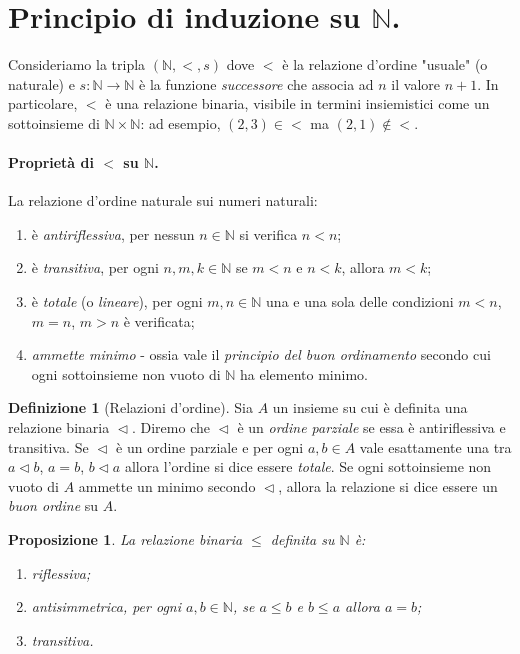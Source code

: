 \documentclass[fontsize = 11 pt, paper=A4, oneside, index=totoc, hyperref]{article}
\theoremstyle{definition}
\newtheorem{dfn}{Definizione}[section]
\theoremstyle{plain}
\newtheorem{prp}{Proposizione}[section]
\newcommand{\N}{\mathbb{N}}
\newcommand{\order}{\vartriangleleft}
\begin{document}
\section{Principio di induzione su \(\mathbb{N}\).}

Consideriamo la tripla \(\left(\N, <, s \right)\) dove \(<\) è la relazione d'ordine "usuale" (o naturale) e \(s \colon \N \to \N\) è la funzione \emph{successore} che associa ad \(n\) il valore \(n+1\). In particolare, \(<\) è una relazione binaria, visibile in termini insiemistici come un sottoinsieme di \(\N \times \N\): ad esempio, \((2,3) \in <\) ma \((2,1) \notin <\).

\paragraph{Proprietà di \(<\) su \(\N\).} La relazione d'ordine naturale sui numeri naturali:
\begin{enumerate}
  \item è \emph{antiriflessiva}, per nessun \(n \in \N\) si verifica \(n < n\);
  \item è \emph{transitiva}, per ogni \(n, m, k \in \N\) se \(m < n\) e \(n < k\), allora \(m < k\);
  \item è \emph{totale} (o \emph{lineare}), per ogni \(m,n \in \N\) una e una sola delle condizioni \(m < n\), \(m = n\), \(m > n\) è verificata;
  \item \emph{ammette minimo} - ossia vale il \emph{principio del buon ordinamento} secondo cui ogni sottoinsieme non vuoto di \(\N\) ha elemento minimo.
\end{enumerate}

\begin{dfn}[Relazioni d'ordine] Sia \(A\) un insieme su cui è definita una relazione binaria \(\order\). Diremo che \(\order\) è un \emph{ordine parziale} se essa è antiriflessiva e transitiva. Se \(\order\) è un ordine parziale e per ogni \(a,b \in A\) vale esattamente una tra \(a \order b\), \(a = b\), \(b \order a\) allora l'ordine si dice essere \emph{totale}. Se ogni sottoinsieme non vuoto di \(A\) ammette un minimo secondo \(\order\), allora la relazione si dice essere un \emph{buon ordine} su \(A\).
\end{dfn}

\begin{prp} La relazione binaria \(\le\) definita su \(\N\) è:
  \begin{enumerate}
    \item \emph{riflessiva};
    \item \emph{antisimmetrica}, per ogni \(a, b \in \N\), se \(a \le b\) e \(b \le a\) allora \(a = b\);
    \item \emph{transitiva}.
  \end{enumerate}
\end{prp}
\end{document}
